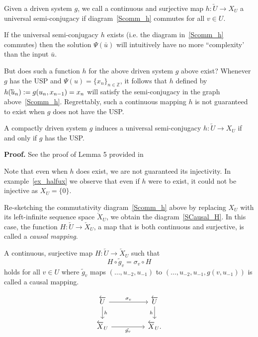   \begin{Definition}
    \label{Def_UnivSemiConj} \rm
    Given a driven system $g$, we  call a continuous and surjective map $h : \overleftarrow{U} \to X_U$ a universal semi-conjugacy if  diagram~\ref{Scomm_h} commutes for all $v \in U$.
  \end{Definition}

  If the universal semi-conjugacy $h$ exists (i.e. the diagram in~\ref{Scomm_h} commutes) then the solution $\Psi(\bar{u})$ will intuitively have no more ``complexity' than the input $\bar{u}$.

But does such a function $h$ for the above driven system $g$ above exist? Whenever $g$ has the USP and $\Psi(u)={\{x_n\}}_{n\in\mathbb{Z}}$, it follows that $h$ defined by  $h(\cev{u}_n):=g(u_n,x_{n-1})=x_n$ will satisfy the semi-conjugacy in the graph above~\ref{Scomm_h}.
Regrettably, such a continuous mapping $h$ is not guaranteed to exist when $g$ does not have the USP.

\begin{Theorem}
  A compactly driven system $g$ induces a universal semi-conjugacy $h:\overleftarrow{U}\to{X_U}$ if and only if $g$ has the USP. 
\end{Theorem}
\vspace{-6mm}
{\bf Proof.} See the proof of Lemma 5 provided in~\cite{Manju_Nonlinearity}

Note that even when $h$ does exist, we are not guaranteed its injectivity. In example~\ref{ex_halfux} we observe that even if $h$ were to exist, it could not be injective as $X_U=\{0\}$.

Re-sketching the commutativity diagram~\ref{Scomm_h} above by replacing $X_U$ with its left-infinite sequence space $\overleftarrow{X}_U$, we obtain the diagram~\ref{SCausal_H}. 
In this case, the function $H:\overleftarrow{U}\to\overleftarrow{X}_U$, a map that is both continuous and surjective, is called a \emph{causal mapping}. 

\begin{Definition}
  \label{Def_CausMap}
  A continuous, surjective map $H:\overleftarrow{U}\to\overleftarrow{X}_U$ such that \[H\circ\tilde{g}_v=\sigma_v \circ{H}\] holds for all $v \in U$ where $\tilde{g}_v$ maps $(\ldots, u_{-2}, u_{-1})$ to $(\ldots, u_{-2}, u_{-1}, g(v, u_{-1}))$ is called a causal mapping.
\end{Definition}

  \begin{equation}\label{SCausal_H}
    \begin{tikzcd}
    \overleftarrow{U} && \overleftarrow{U}\\
     \overleftarrow{X}_U && \overleftarrow{X}_U.
     \\
    \arrow["{\sigma_v}", from=1-1, to=1-3]
	\arrow["h"', from=1-3, to=2-3]
	\arrow["h", from=1-1, to=2-1]
	\arrow["{\tilde{g_v}}"', from=2-1, to=2-3]
\end{tikzcd}
\end{equation}


